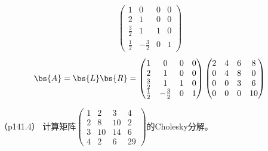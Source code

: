 \documentclass[12pt, a4paper, oneside, UTF8]{ctexbook}
\begin{document}
\begin{solution}
\begin{align*}
\begin{pmatrix}
                    1& 0 &0 &0\\
                    2&1&0&0\\
                    \frac{3}{2}&1&1&0\\
                    \frac{1}{2}&-\frac{3}{2}&0&1
                \end{pmatrix}
            \end{align*}
\begin{align*}
    \bs{A}=\bs{L}\bs{R}=\begin{pmatrix}
        1& 0 &0 &0\\
        2&1&0&0\\
        \frac{3}{2}&1&1&0\\
        \frac{1}{2}&-\frac{3}{2}&0&1
    \end{pmatrix}
    \begin{pmatrix}
        2&4&6&8\\
        0&4&8&0\\
        0&0&3&6\\
        0&0&0&10
    \end{pmatrix}
\end{align*}
\end{solution}

\begin{question}（p141.4）
    计算矩阵$\begin{pmatrix}
        1&2&3&4\\
        2&8&10&2\\
        3&10&14&6\\
        4&2&6&29
    \end{pmatrix}$的Cholesky分解。
\end{question}
\end{document}
